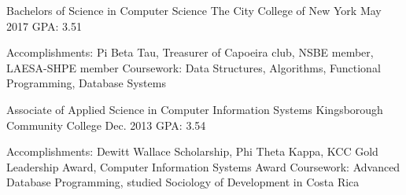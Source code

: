 \begin{cventries}
\iftrue
  \cventry
    {Bachelors of Science in Computer Science} %
    {The City College of New York} %
    {May 2017} %
    {GPA: 3.51} %
	{
	  	  \begin{cvskills} %
		\cvskill
		  {Accomplishments:} %
		  {Pi Beta Tau, Treasurer of Capoeira club, NSBE member, LAESA-SHPE
		  member} %
		\cvskill
		  {Coursework:} %
		  {Data Structures, Algorithms, Functional Programming, Database
		  Systems} %
	  \end{cvskills}
	} %
\fi

\iftrue
  \cventry
    {Associate of Applied Science in Computer Information Systems} %
    {Kingsborough Community College} %
    {Dec. 2013} %
    {GPA: 3.54} %
    {
	  \begin{cvskills} %
		\cvskill
		  {Accomplishments:} %
		  {Dewitt Wallace Scholarship, Phi Theta Kappa, KCC Gold Leadership Award, Computer Information Systems Award} %
		\cvskill
		  {Coursework:} %
		  {Advanced Database Programming, studied Sociology of Development in Costa Rica} %
	  \end{cvskills}
	}
\fi

\iffalse
  \cventry
    {Associate of Occupational Studies in Computer Programming} %
    {Wood Tobe-Coburn School} %
    {Aug. 2008} %
    {GPA: 3.6} %
    {
	  \begin{cvskills} %
		\cvskill
		  {Coursework:} %
		  {Visual Basic for Applications, Server Administration} %
	  \end{cvskills}
	}
\fi

\end{cventries}
